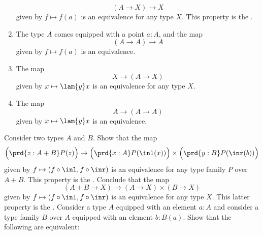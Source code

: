 \begin{exercises}
\begin{enumerate}
    \begin{equation*}
      (A\to X)\to X
    \end{equation*}
    given by $f\mapsto f(a)$ is an equivalence for any type $X$. This property is the .
  \item The type $A$ comes equipped with a point $a:A$, and the map
    \begin{equation*}
      (A\to A)\to A
    \end{equation*}
    given by $f\mapsto f(a)$ is an equivalence.
  \item \label{item:is-equiv-diag-universal}The map
    \begin{equation*}
      X\to (A\to X)
    \end{equation*}
    given by $x\mapsto\lam{y}x$ is an equivalence for any type $X$.
  \item \label{item:is-equiv-diag}The map
    \begin{equation*}
      A\to (A\to A)
    \end{equation*}
    given by $x\mapsto\lam{y}x$ is an equivalence.
  \end{enumerate}
  \exitem \label{ex:up-coproduct}
  Consider two types $A$ and $B$. Show that the map
  \begin{equation*}
    \Big(\prd{z:A+B}P(z)\Big)\to\Big(\prd{x:A}P(\inl(x))\Big)\times\Big(\prd{y:B}P(\inr(b))\Big)
  \end{equation*}
  given by $f\mapsto (f\circ \inl,f\circ \inr)$ is an equivalence for any type family $P$ over $A+B$. This property is the . Conclude that the map
  \begin{equation*}
    (A+B\to X)\to (A\to X)\times (B\to X)
  \end{equation*}
  given by $f\mapsto (f\circ \inl,f\circ \inr)$ is an equivalence for any type $X$. This latter property is the .
  \exitem\label{ex:uniqueness-identity-type}Consider a type $A$ equipped with an element $a:A$ and consider a type family $B$ over $A$ equipped with an element $b:B(a)$. Show that the following are equivalent:

\end{exercises}
